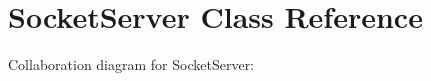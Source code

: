\hypertarget{class_socket_server}{}\section{Socket\+Server Class Reference}
\label{class_socket_server}


Collaboration diagram for Socket\+Server\+:
